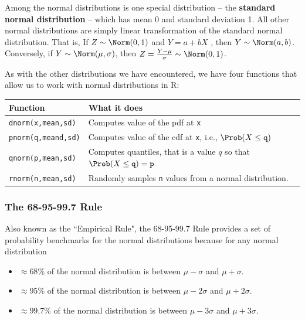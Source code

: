 \documentclass[twoside]{book}\usepackage[]{graphicx}\usepackage[]{xcolor}
\def\R{{\sf R}}
\def\term#1{\textbf{#1}}
\begin{document}
Among the normal distributions is one special distribution -- the \term{standard normal
distribution} -- which has mean 0 and standard deviation 1. All other normal 
distributions are simply linear transformation of the standard normal distribution.
That is,
If $Z \sim \Norm(0,1)$ and $Y = a + b X$ , then $Y \sim \Norm(a, b)$.  Conversely,
if $Y \sim \Norm(\mu, \sigma)$, then $Z = \frac{ Y - \mu }{\sigma} \sim \Norm(0,1)$.

As with the other distributions we have encountered, we have four functions
that allow us to work with normal distributions in \R:

\begin{center}
\begin{tabular}{ll}
	\hline
	Function & What it does \\
	\hline
	\texttt{dnorm(x,mean,sd)} & Computes value of the pdf at \texttt{x}
	\\
	\texttt{pnorm(q,meand,sd)} 
		& Computes value of the cdf at \texttt{x}, i.e., 
	$\Prob(X \le \texttt{q})$
	\\
	\texttt{qnorm(p,mean,sd)} 
		& Computes quantiles, that is a value $q$ so that 
	$\Prob(X \le \texttt{q}) = \texttt{p}$
    \\
	\texttt{rnorm(n,mean,sd)} & Randomly samples \texttt{n} values from a
	normal distribution.
	\\
	\hline
\end{tabular}
\end{center}

\subsubsection{The 68-95-99.7 Rule}

Also known as the ``Empirical Rule", the 68-95-99.7 Rule provides a set of probability
benchmarks for the normal distributions because for any normal distribution 
\begin{itemize} 
	\item
		$\approx 68$\% of the normal distribution is between 
		$\mu-\sigma$ and $\mu + \sigma$.
	\item
		$\approx 95$\% of the normal distribution is between 
		$\mu- 2\sigma$ and $\mu + 2\sigma$.
	\item
		$\approx 99.7$\% of the normal distribution is between 
		$\mu- 3\sigma$ and $\mu + 3\sigma$.
\end{itemize} 
\end{document}
